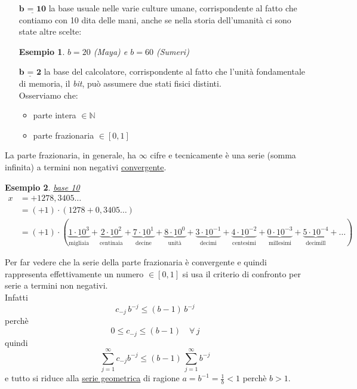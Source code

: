 \documentclass[12pt]{article}
\newtheorem*{esempio}{Esempio}
\begin{document}
\begin{itemize}
	\item[$\underline{\textbf{b = 10}}$] la base usuale nelle varie culture umane, corrispondente al fatto che contiamo con 10 dita delle mani, anche se nella storia dell'umanità ci sono state altre scelte:
	\begin{esempio}
	$b = 20$ (Maya) e $b = 60$ (Sumeri)
	\end{esempio}
	\item[$\underline{\textbf{b = 2}}$] la base del calcolatore, corrispondente al fatto che l'unità fondamentale di memoria, il \textit{bit}, può assumere due stati fisici distinti. \\
	Osserviamo che:
	\begin{itemize}
	    \item parte intera $\in \mathbb{N}$
	    \item parte frazionaria $\in [0,1]$
	\end{itemize}
\end{itemize}
La parte frazionaria, in generale, ha $\infty$ cifre e tecnicamente è una serie (somma infinita) a termini non negativi \underline{convergente}.
\begin{esempio}
\underline{base 10}
\[ \begin{split}
    x & = +1278,3405 \dotsc \\
    & = (+1) \cdot (1278 + 0,3405 \dotsc) \\
    & = (+1) \cdot ( \underbrace{1 \cdot 10^3}_{\text {migliaia}} + %
    \underbrace{2 \cdot 10^2}_{\text {centinaia}} + %
    \underbrace{7 \cdot 10^1}_{\text {decine}} + %
    \underbrace{8 \cdot 10^0}_{\text {unità}} + %
    \underbrace{3 \cdot 10^{-1}}_{\text {decimi}} + %
    \underbrace{4 \cdot 10^{-2}}_{\text {centesimi}} + %
    \underbrace{0 \cdot 10^{-3}}_{\text {millesimi}} + %
    \underbrace{5 \cdot 10^{-4}}_{\text {decimill}} + \dotsc) 
\end{split} \]
\end{esempio}
Per far vedere che la serie della parte frazionaria è convergente e quindi rappresenta effettivamente un numero $\in [0,1]$ si usa il criterio di confronto per serie a termini non negativi. \\
Infatti \[ c_{-j}\,b^{-j} \le (b-1)\,b^{-j} \]
perchè \[ 0 \le c_{-j} \le (b-1) \quad \forall \, j \]
quindi \[ \sum_{j=1}^{\infty}c_{-j}b^{-j} \le (b-1)\,\sum_{j=1}^{\infty}b^{-j} \]
e tutto si riduce alla \underline{serie geometrica} di ragione $a = b^{-1} = \frac{1}{b} < 1$ perchè $b > 1$.\\
\end{document}
